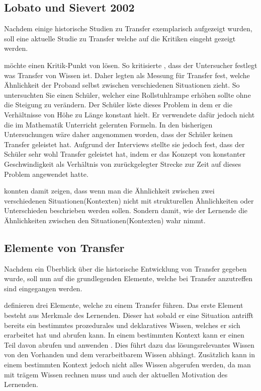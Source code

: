 \subsection{Lobato und Sievert 2002}



Nachdem einige historische Studien zu Transfer exemplarisch aufgezeigt wurden, soll eine aktuelle Studie zu Transfer welche auf die Kritiken eingeht gezeigt werden.


\citet{Lobato2002a} möchte einen Kritik-Punkt von \citet{Lave1988} lösen. So kritisierte \citeauthor{Lave1988}, dass der Untersucher festlegt was Transfer von Wissen ist. Daher legten \citet{Lobato2002a} als Messung für Transfer fest, welche Ähnlichkeit der Proband selbst zwischen verschiedenen Situationen zieht. So untersuchten Sie einen Schüler, welcher eine Rollstuhlrampe erhöhen sollte ohne die Steigung zu verändern. Der Schüler löste dieses Problem in dem er die Verhältnisse von Höhe zu Länge konstant hielt. Er verwendete dafür jedoch nicht die im Mathematik Unterricht gelernten Formeln. In den bisherigen Untersuchungen wäre daher angenommen worden, dass der Schüler keinen Transfer geleistet hat. Aufgrund der Interviews stellte sie jedoch fest, dass der Schüler sehr wohl Transfer geleistet hat, indem er das Konzept von konstanter Geschwindigkeit als Verhältnis von zurückgelegter Strecke zur Zeit auf dieses Problem angewendet hatte.

\citet{Lobato2002a} konnten damit zeigen, dass wenn man die Ähnlichkeit zwischen zwei verschiedenen Situationen(Kontexten) nicht mit strukturellen Ähnlichkeiten oder Unterschieden beschrieben werden sollen. Sondern damit, wie der Lernende die Ähnlichkeiten zwischen den Situationen(Kontexten) wahr nimmt.

\subsection{Elemente von Transfer}

Nachdem ein Überblick über die historische Entwicklung von Transfer gegeben wurde, soll nun auf die grundlegenden Elemente, welche bei Transfer anzutreffen sind eingegangen werden.

\citet{Marini1995} definieren drei Elemente, welche zu einem Transfer führen. Das erste Element besteht aus Merkmale des Lernenden. Dieser hat sobald er eine Situation antrifft bereits ein bestimmtes prozedurales und deklaratives Wissen, welches er sich erarbeitet hat und abrufen kann. In einem bestimmten Kontext kann er einen Teil davon abrufen und anwenden \citep[s. S. 189ff]{Marini1995}. Dies führt dazu das lösungsrelevantes Wissen von den Vorhanden und dem verarbeitbarem Wissen abhängt. Zusätzlich kann in einem bestimmten Kontext jedoch nicht alles Wissen abgerufen werden, da man mit trägem Wissen rechnen muss und auch der aktuellen Motivation des Lernenden. 

